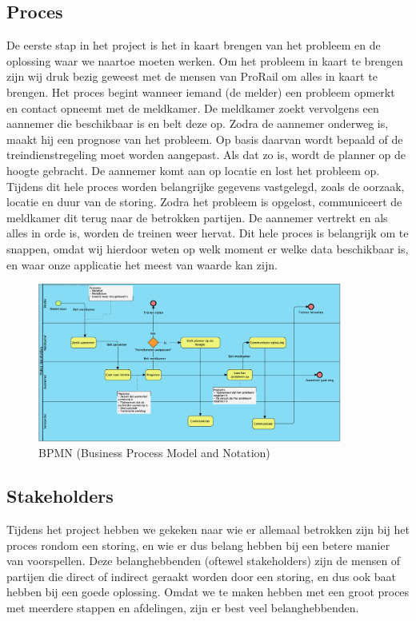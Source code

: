 \documentclass{article}
\begin{document}
\subsection{Proces}
De eerste stap in het project is het in kaart brengen van het probleem en de oplossing waar we naartoe moeten werken. Om het probleem in kaart te brengen zijn wij druk bezig geweest met de mensen van ProRail om alles in kaart te brengen. Het proces begint wanneer iemand (de melder) een probleem opmerkt en contact opneemt met de meldkamer. De meldkamer zoekt vervolgens een aannemer die beschikbaar is en belt deze op. Zodra de aannemer onderweg is, maakt hij een prognose van het probleem. Op basis daarvan wordt bepaald of de treindienstregeling moet worden aangepast. Als dat zo is, wordt de planner op de hoogte gebracht. De aannemer komt aan op locatie en lost het probleem op. Tijdens dit hele proces worden belangrijke gegevens vastgelegd, zoals de oorzaak, locatie en duur van de storing. Zodra het probleem is opgelost, communiceert de meldkamer dit terug naar de betrokken partijen. De aannemer vertrekt en als alles in orde is, worden de treinen weer hervat. Dit hele proces is belangrijk om te snappen, omdat wij hierdoor weten op welk moment er welke data beschikbaar is, en waar onze applicatie het meest van waarde kan zijn.

\begin{figure}[H]
    \centering
    \includegraphics[width=10cm]{bpmn.png}
    \caption{BPMN (Business Process Model and Notation)}
\end{figure}

\subsection{Stakeholders}
Tijdens het project hebben we gekeken naar wie er allemaal betrokken zijn bij het proces rondom een storing, en wie er dus belang hebben bij een betere manier van voorspellen. Deze belanghebbenden (oftewel stakeholders) zijn de mensen of partijen die direct of indirect geraakt worden door een storing, en dus ook baat hebben bij een goede oplossing. Omdat we te maken hebben met een groot proces met meerdere stappen en afdelingen, zijn er best veel belanghebbenden.
\end{document}
